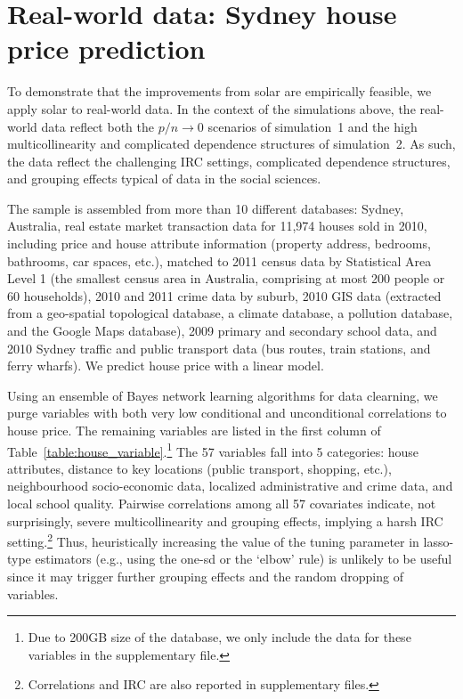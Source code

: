 \documentclass[11pt,authoryear]{elsarticle}
\begin{document}
\section{Real-world data: Sydney house price prediction\label{section:application}}

To demonstrate that the improvements from solar are empirically feasible, we apply solar to real-world data. In the context of the simulations above, the real-world data reflect both the $p/n\rightarrow0$ scenarios of simulation~1 and the high multicollinearity and complicated dependence structures of simulation~2. As such, the data reflect the challenging IRC settings, complicated dependence structures, and grouping effects typical of data in the social sciences.

The sample is assembled from more than 10 different databases: Sydney, Australia, real estate market transaction data for 11,974 houses sold in 2010, including price and house attribute information (property address, bedrooms, bathrooms, car spaces, etc.), matched to 2011 census data by Statistical Area Level 1 (the smallest census area in Australia, comprising at most 200 people or 60 households), 2010 and 2011 crime data by suburb, 2010 GIS data (extracted from a geo-spatial topological database, a climate database, a pollution database, and the Google Maps database), 2009 primary and secondary school data, and 2010 Sydney traffic and public transport data (bus routes, train stations, and ferry wharfs). We predict house price with a linear model.

Using an ensemble of Bayes network learning algorithms for data clearning, we purge variables with both very low conditional and unconditional correlations to house price. The remaining variables are listed in the first column of Table~\ref{table:house_variable}.\footnote{Due to 200GB size of the database, we only include the data for these variables in the supplementary file.} The 57 variables fall into 5 categories: house attributes, distance to key locations (public transport, shopping, etc.), neighbourhood socio-economic data, localized administrative and crime data, and local school quality. Pairwise correlations among all 57 covariates indicate, not surprisingly, severe multicollinearity and grouping effects, implying a harsh IRC setting.\footnote{Correlations and IRC are also reported in supplementary files.} Thus, heuristically increasing the value of the tuning parameter in lasso-type estimators (e.g., using the one-sd or the `elbow' rule) is unlikely to be useful since it may trigger further grouping effects and the random dropping of variables.
\end{document}
